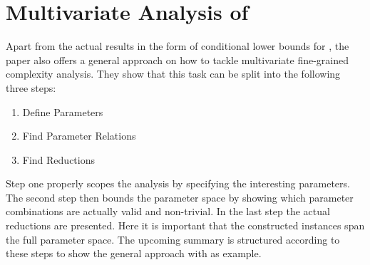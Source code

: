 \section{Multivariate Analysis of \lcs}
Apart from the actual results in the form of conditional lower bounds for \lcs{}, the paper also offers a general approach on how to tackle multivariate fine-grained complexity analysis.
They show that this task can be split into the following three steps:
\begin{enumerate}
	\item Define Parameters
	\item Find Parameter Relations
	\item Find Reductions
\end{enumerate}
Step one properly scopes the analysis by specifying the interesting parameters.
The second step then bounds the parameter space by showing which parameter combinations are actually valid and non-trivial.
In the last step the actual reductions are presented.
Here it is important that the constructed instances span the full parameter space.
The upcoming summary is structured according to these steps to show the general approach with \lcs{} as example.










